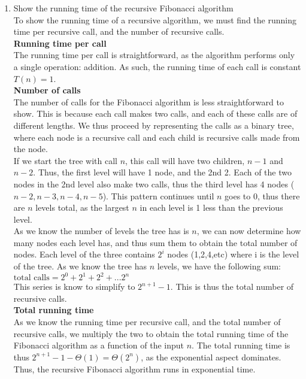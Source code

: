 \documentclass{article}
\begin{document}
\begin{enumerate}
	\item Show the running time of the recursive Fibonacci algorithm
	\\ To show the running time of a recursive algorithm, we must find the running time per recursive call, and the number of recursive calls.
	\\ \textbf{Running time per call}
	\\ The running time per call is straightforward, as the algorithm performs only a single operation: addition. As such, the running time of each call is constant $T(n)=1$.
	\\ \textbf{Number of calls}
	\\ The number of calls for the Fibonacci algorithm is less straightforward to show. This is because each call makes two calls, and each of these calls are of different lengths. We thus proceed by representing the calls as a binary tree, where each node is a recursive call and each child is recursive calls made from the node.
	\\ If we start the tree with call $n$, this call will have two children, $n-1$ and $n-2$. Thus, the first level will have 1 node, and the 2nd 2. Each of the two nodes in the 2nd level also make two calls, thus the third level has 4 nodes ($n-2,n-3,n-4,n-5$). This pattern continues until $n$ goes to 0, thus there are $n$ levels total, as the largest $n$ in each level is 1 less than the previous level. 
	\\ As we know the number of levels the tree has is $n$, we can now determine how many nodes each level has, and thus sum them to obtain the total number of nodes. Each level of the three contains $2^i$ nodes (1,2,4,etc) where i is the level of the tree. As we know the tree has $n$ levels, we have the following sum:
	\\$\text{total calls}=2^0+2^1+2^2+...2^n$
	\\ This series is know to simplify to $2^{n+1}-1$. This is thus the total number of recursive calls.
	\\ \textbf{Total running time}
	\\ As we know the running time per recursive call, and the total number of recursive calls, we multiply the two to obtain the total running time of the Fibonacci algorithm as a function of the input $n$. The total running time is thus $2^{n+1}-1-\Theta(1)=\Theta(2^n)$, as the exponential aspect dominates. Thus, the recursive Fibonacci algorithm runs in exponential time.
\end{enumerate}
\end{document}
